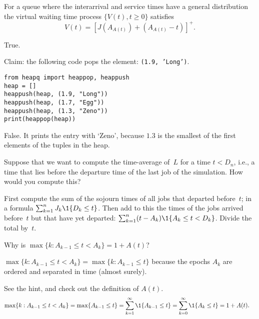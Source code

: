 \documentclass[stochastic-or.tex]{subfiles}
\begin{document}
\begin{truefalse}
For a queue where the interarrival and service times have a general distribution the virtual waiting time process $\{V(t), t\geq 0\}$
satisfies
 \begin{equation*}
 V(t) = [J(A_{A(t)}) + (A_{A(t)}-t)]^+.
 \end{equation*}
\begin{solution} True.
\end{solution}
\end{truefalse}



\begin{truefalse}
Claim: the following code pops the element: \texttt{(1.9, 'Long')}.
\begin{verbatim}
from heapq import heappop, heappush
heap = []
heappush(heap, (1.9, "Long"))
heappush(heap, (1.7, "Egg"))
heappush(heap, (1.3, "Zeno"))
print(heappop(heap))
\end{verbatim}
\begin{solution}
    False. It prints the entry with `Zeno', because $1.3$ is the smallest of the first elements of the tuples in the heap.
\end{solution}
\end{truefalse}




\begin{exercise}
Suppose that we want to compute the time-average of~$L$ for a time $t<D_{n}$, i.e., a time that lies before the departure time of the last job of the simulation. How would you compute this?
\begin{solution}
First compute the sum of the sojourn times of all jobs that departed before~$t$; in a formula $\sum_{k=1}^{n}J_k \1{D_k\leq t}$. Then add to this the times of the jobs arrived before~$t$  but that have yet departed:  $\sum_{k=1}^n (t-A_k)\1{A_k\leq t < D_{k}}$. Divide the total by~$t$.
\end{solution}
\end{exercise}

\begin{exercise}\label{ex:55}
Why is $\max\{k: A_{k-1} \leq t < A_{k}\} = 1 + A(t)$?
\begin{hint}
$\max\{k: A_{k-1} \leq t < A_{k}\} = \max\{k : A_{k-1} \leq t\}$ because the epochs $A_{k}$ are ordered and separated  in time (almost surely).
\end{hint}
\begin{solution}
See the hint, and check out the definition of $A(t)$.
\begin{align*}
  \max\{k: A_{k-1} \leq t < A_{k}\} &= \max\{A_{k-1} \leq t\} = \sum_{k=1}^{\infty} \1{A_{k-1}\leq t} = \sum_{k=0}^{\infty} \1{A_{k}\leq t}  =  1 + A(t).
\end{align*}
\end{solution}
\end{exercise}



\end{document}
